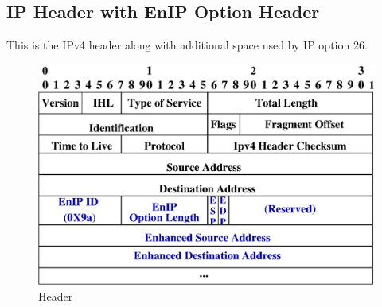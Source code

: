 \subsection{IP Header with EnIP Option Header}
This is the IPv4 header along with additional space used 
by IP option 26\cite{rfc791}.


\begin{figure}[H]
\begin{center}
\caption{Header}
\label{Figure 1}
\includegraphics[scale=.5]{images/EnIPHdr.eps}
\end{center}
\end{figure} 


